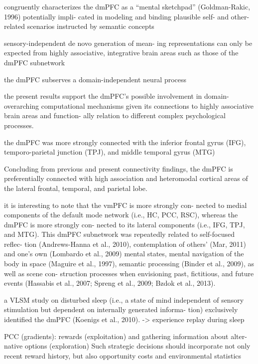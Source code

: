 \documentclass{article} %
\begin{document}
congruently characterizes the dmPFC as a “mental sketchpad” (Goldman-Rakic, 1996) potentially impli- cated in modeling and binding plausible self- and other-related scenarios instructed by semantic concepts 

 sensory-independent de novo generation of mean- ing representations can only be expected from highly associative, integrative brain areas such as those of the dmPFC subnetwork
 


the dmPFC subserves a domain-independent neural process

the present results support the dmPFC’s possible involvement in domain-overarching computational mechanisms given its connections to highly associative brain areas and function- ally relation to different complex psychological processes.



the dmPFC was more strongly connected with the inferior frontal gyrus (IFG), temporo-parietal junction (TPJ), and middle temporal gyrus (MTG)

Concluding from previous and present connectivity findings, the dmPFC is preferentially connected with high association and heteromodal cortical areas of the lateral frontal, temporal, and parietal lobe.

it is interesting to note that the vmPFC is more strongly con- nected to medial components of the default mode network (i.e., HC, PCC, RSC), whereas the dmPFC is more strongly con- nected to its lateral components (i.e., IFG, TPJ, and MTG). This dmPFC subnetwork was repeatedly related to self-focused reflec- tion (Andrews-Hanna et al., 2010), contemplation of others’ (Mar, 2011) and one’s own (Lombardo et al., 2009) mental states, mental navigation of the body in space (Maguire et al., 1997), semantic processing (Binder et al., 2009), as well as scene con- struction processes when envisioning past, fictitious, and future events (Hassabis et al., 2007; Spreng et al., 2009; Bzdok et al., 2013).



a VLSM study on disturbed sleep (i.e., a state of mind independent of sensory stimulation but dependent on internally generated informa- tion) exclusively identified the dmPFC (Koenigs et al., 2010).
-> experience replay during sleep



PCC (gradients): rewards (exploitation) and gathering information about alter- native options (exploration)
Such strategic decisions should incorporate not only recent reward history, but also opportunity costs and environmental statistics
\end{document}
